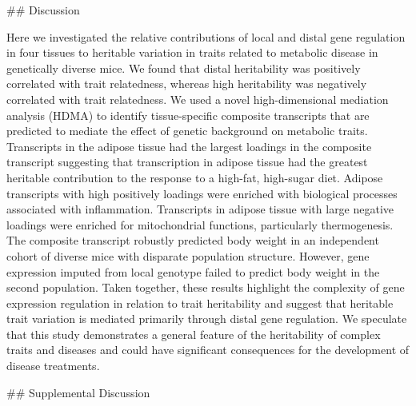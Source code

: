 ## Discussion

Here we investigated the relative contributions of local and distal gene 
regulation in four tissues to heritable variation in traits related to 
metabolic disease in genetically diverse mice. We found that 
distal heritability was positively correlated with trait relatedness, 
whereas high heritability was negatively correlated with trait 
relatedness. We used a novel high-dimensional mediation analysis 
(HDMA) to identify tissue-specific composite transcripts that are predicted to 
mediate the effect of genetic background on metabolic traits. Transcripts 
in the adipose tissue had the largest loadings in the composite transcript 
suggesting that transcription in adipose tissue had the greatest heritable 
contribution to the response to a high-fat, high-sugar diet. Adipose 
transcripts with high positively loadings were enriched with biological 
processes associated with inflammation. Transcripts in adipose tissue 
with large negative loadings were enriched for mitochondrial functions, 
particularly thermogenesis. The composite transcript robustly predicted 
body weight in an independent cohort of diverse mice with disparate 
population structure. However, gene expression imputed from local 
genotype failed to predict body weight in the second population. Taken
together, these results highlight the complexity of gene expression 
regulation in relation to trait heritability and suggest that heritable 
trait variation is mediated primarily through distal gene regulation.
We speculate that this study demonstrates a general feature of the
heritability of complex traits and diseases and could have significant
consequences for the development of disease treatments.

## Supplemental Discussion

